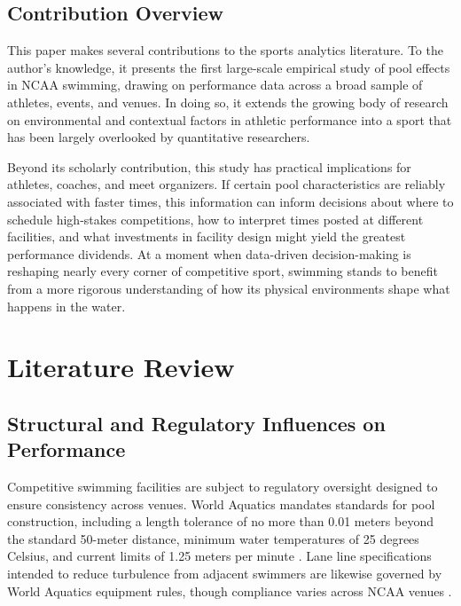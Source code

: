 \documentclass[12pt]{article}
\begin{document}
\subsection{Contribution Overview}

This paper makes several contributions to the sports analytics literature. To
the author's knowledge, it presents the first large-scale empirical study of
pool effects in NCAA swimming, drawing on performance data across a broad
sample of athletes, events, and venues. In doing so, it extends the growing
body of research on environmental and contextual factors in athletic performance
into a sport that has been largely overlooked by quantitative researchers.

Beyond its scholarly contribution, this study has practical implications for
athletes, coaches, and meet organizers. If certain pool characteristics are
reliably associated with faster times, this information can inform decisions
about where to schedule high-stakes competitions, how to interpret times posted
at different facilities, and what investments in facility design might yield the
greatest performance dividends. At a moment when data-driven decision-making is
reshaping nearly every corner of competitive sport, swimming stands to benefit
from a more rigorous understanding of how its physical environments shape what
happens in the water.

\section{Literature Review}

\subsection{Structural and Regulatory Influences on Performance}

Competitive swimming facilities are subject to regulatory oversight designed to
ensure consistency across venues. World Aquatics mandates standards for pool
construction, including a length tolerance of no more than 0.01 meters beyond
the standard 50-meter distance, minimum water temperatures of 25 degrees
Celsius, and current limits of 1.25 meters per minute \parencite{fina2021}.
Lane line specifications intended to reduce turbulence from adjacent swimmers
are likewise governed by World Aquatics equipment rules, though compliance
varies across NCAA venues \parencite{fina2021}.
\end{document}
